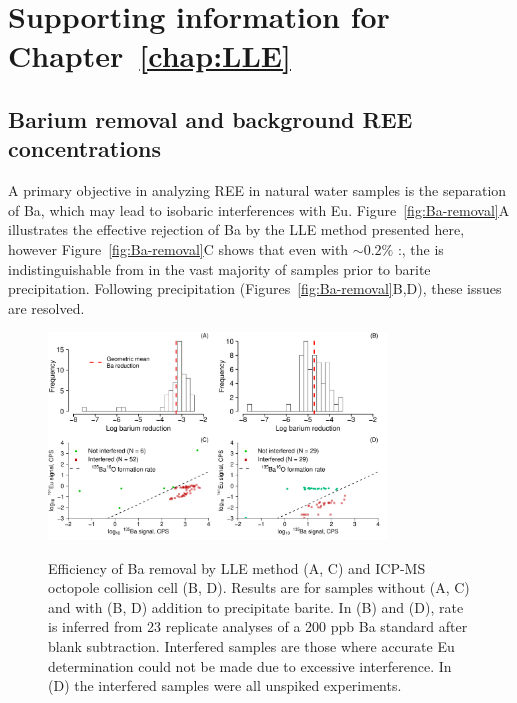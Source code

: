\chapter{Supporting information for Chapter~\ref{chap:LLE}}
\section{Barium removal and background REE concentrations}

A primary objective in analyzing REE in natural water samples is the separation of Ba, which may lead to isobaric interferences with Eu.
Figure~\ref{fig:Ba-removal}A illustrates the effective rejection of Ba by the LLE method presented here, however Figure~\ref{fig:Ba-removal}C shows that even with $\sim0.2\%$ :, the  is indistinguishable from  in the vast majority of samples prior to barite precipitation.
Following precipitation (Figures~\ref{fig:Ba-removal}B,D), these issues are resolved.

\begin{figure}[htbp]
\begin{center}
\includegraphics[width=0.8\textwidth]{Ch4_figures/Ba-removal.pdf}
\caption{Efficiency of Ba removal by LLE method (A, C) and ICP-MS octopole collision cell (B, D).
Results are for samples without (A, C) and with (B, D)  addition to precipitate barite.
In (B) and (D),  rate is inferred from 23 replicate analyses of a 200 ppb Ba standard after blank subtraction.
Interfered samples are those where accurate Eu determination could not be made due to excessive  interference. In (D) the interfered samples were all unspiked experiments.}\label{fig:Ba-removal}
\label{default}
\end{center}
\end{figure}

